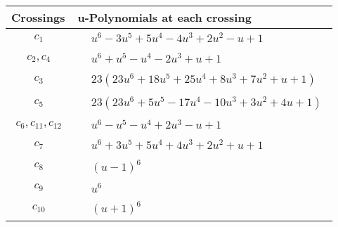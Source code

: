 \documentclass[1p]{elsarticle_modified}
\theoremstyle{definition}
\begin{document}
\begin{tabular}{m{50pt}|m{274pt}}
Crossings & \hspace{64pt}u-Polynomials at each crossing \\
\hline $$\begin{aligned}c_{1}\end{aligned}$$&$\begin{aligned}
&u^6-3 u^5+5 u^4-4 u^3+2 u^2- u+1
\end{aligned}$\\
\hline $$\begin{aligned}c_{2},c_{4}\end{aligned}$$&$\begin{aligned}
&u^6+u^5- u^4-2 u^3+u+1
\end{aligned}$\\
\hline $$\begin{aligned}c_{3}\end{aligned}$$&$\begin{aligned}
&23(23 u^6+18 u^5+25 u^4+8 u^3+7 u^2+u+1)
\end{aligned}$\\
\hline $$\begin{aligned}c_{5}\end{aligned}$$&$\begin{aligned}
&23(23 u^6+5 u^5-17 u^4-10 u^3+3 u^2+4 u+1)
\end{aligned}$\\
\hline $$\begin{aligned}c_{6},c_{11},c_{12}\end{aligned}$$&$\begin{aligned}
&u^6- u^5- u^4+2 u^3- u+1
\end{aligned}$\\
\hline $$\begin{aligned}c_{7}\end{aligned}$$&$\begin{aligned}
&u^6+3 u^5+5 u^4+4 u^3+2 u^2+u+1
\end{aligned}$\\
\hline $$\begin{aligned}c_{8}\end{aligned}$$&$\begin{aligned}
&(u-1)^6
\end{aligned}$\\
\hline $$\begin{aligned}c_{9}\end{aligned}$$&$\begin{aligned}
&u^6
\end{aligned}$\\
\hline $$\begin{aligned}c_{10}\end{aligned}$$&$\begin{aligned}
&(u+1)^6
\end{aligned}$\\
\hline
\end{tabular}\\~\\
\end{document}
